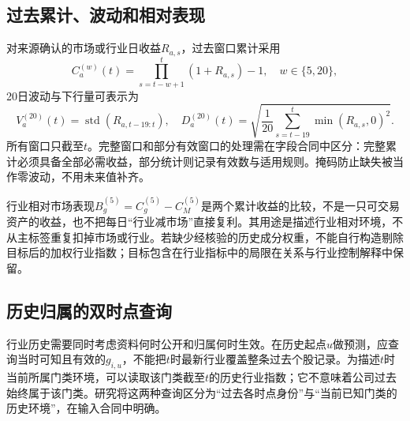 \subsection{过去累计、波动和相对表现}
对来源确认的市场或行业日收益$R_{a,s}$，过去窗口累计采用
\begin{equation}
 C_a^{(w)}(t)=\prod_{s=t-w+1}^{t}(1+R_{a,s})-1,\quad w\in\{5,20\},
\end{equation}
20日波动与下行量可表示为
\begin{equation}
 V_a^{(20)}(t)=\operatorname{std}(R_{a,t-19:t}),\quad
 D_a^{(20)}(t)=\sqrt{\frac1{20}\sum_{s=t-19}^{t}\min(R_{a,s},0)^2}.
\end{equation}
所有窗口只截至$t$。完整窗口和部分有效窗口的处理需在字段合同中区分：完整累计必须具备全部必需收益，部分统计则记录有效数与适用规则。掩码防止缺失被当作零波动，不用未来值补齐。

行业相对市场表现$B_g^{(5)}=C_g^{(5)}-C_M^{(5)}$是两个累计收益的比较，不是一只可交易资产的收益，也不把每日“行业减市场”直接复利。其用途是描述行业相对环境，不从主标签重复扣掉市场或行业。若缺少经核验的历史成分权重，不能自行构造剔除目标后的加权行业指数；目标包含在行业指标中的局限在关系与行业控制解释中保留。


\subsection{历史归属的双时点查询}
行业历史需要同时考虑资料何时公开和归属何时生效。在历史起点$u$做预测，应查询当时可知且有效的$g_{i,u}$，不能把$t$时最新行业覆盖整条过去个股记录。为描述$t$时当前所属门类环境，可以读取该门类截至$t$的历史行业指数；它不意味着公司过去始终属于该门类。研究将这两种查询区分为“过去各时点身份”与“当前已知门类的历史环境”，在输入合同中明确。

